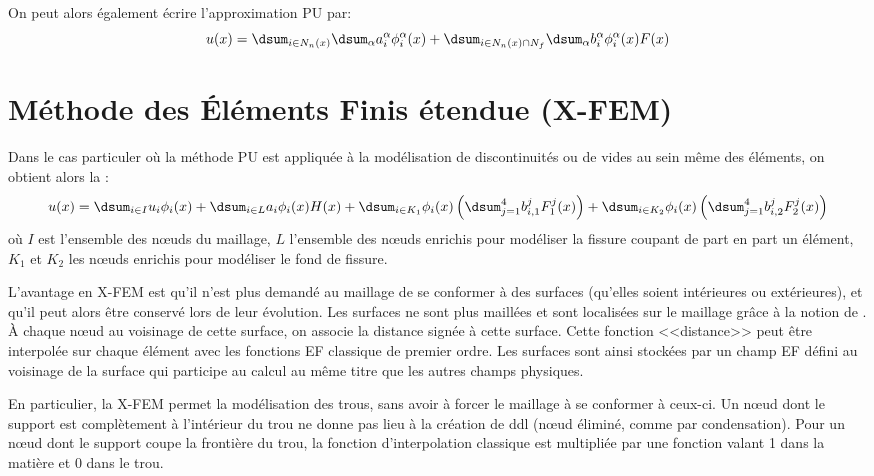 On peut alors également écrire l'approximation PU par:
\begin{equation}
u(x) = \dsum_{i\in N_n(x)}\dsum_{\alpha} a_i^\alpha \phi_i^\alpha(x) +
\dsum_{i\in N_n(x)\cap N_f}\dsum_{\alpha} b_i^\alpha\phi_i^\alpha(x)F(x)
\end{equation}



\medskip
\section{Méthode des Éléments Finis étendue (X-FEM)}\label{Sec-XFEM}

Dans le cas particuler où la méthode PU 
est appliquée à la modélisation de
discontinuités ou de vides au sein même des éléments, on obtient alors la
:
\begin{equation}
u(x) = \dsum_{i\in I}u_i\phi_i(x) 
+ \dsum_{i\in L} a_i\phi_i(x) H(x)
+ \dsum_{i\in K_1}\phi_i(x)\left(\dsum_{j=1}^4b_{i,1}^jF_1^j(x)\right)
+ \dsum_{i\in K_2}\phi_i(x)\left(\dsum_{j=1}^4b_{i,2}^jF_2^j(x)\right)
\end{equation}
où $I$ est l'ensemble des nœuds du maillage, $L$ l'ensemble des nœuds
enrichis pour modéliser la fissure coupant de part en part un élément, 
$K_1$ et $K_2$ les nœuds enrichis pour modéliser le fond de fissure.

\medskip
L'avantage en X-FEM 
est qu'il n'est plus demandé au maillage de se conformer à des surfaces
(qu'elles soient intérieures ou extérieures), et qu'il peut alors être conservé lors de leur évolution.
Les surfaces ne sont plus maillées et sont localisées sur le maillage grâce à la notion de 
. À chaque nœud au voisinage de cette surface, on associe 
la distance signée à cette surface.
Cette fonction <<distance>> peut être interpolée sur chaque élément avec les fonctions
EF classique de premier ordre. Les surfaces sont ainsi stockées par un champ EF défini
au voisinage de la surface qui participe au calcul au même titre que les autres champs physiques.

En particulier, la X-FEM 
permet la modélisation des trous, sans avoir à forcer le maillage à se conformer
à ceux-ci. Un nœud dont le support est complètement à l'intérieur du trou ne donne pas
lieu à la création de ddl (nœud éliminé, comme par condensation). 
Pour un nœud dont le support coupe la frontière du trou, la fonction d'interpolation classique est 
multipliée par une fonction valant 1 dans la matière et 0 dans le trou.






